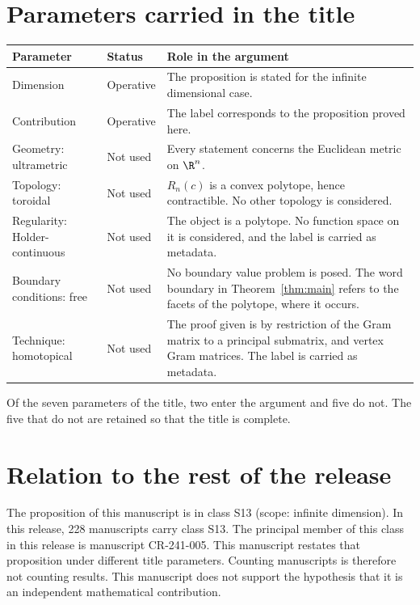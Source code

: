 \documentclass[11pt]{article}
\begin{document}
\section{Parameters carried in the title}\label{sec:params}
\begin{center}
\small
\begin{tabular}{p{}p{}p{}}
\toprule
Parameter & Status & Role in the argument \\
\midrule
Dimension & Operative & The proposition is stated for the infinite dimensional case. \\
Contribution & Operative & The label corresponds to the proposition proved here. \\
Geometry: ultrametric & Not used & Every statement concerns the Euclidean metric on $\R^n$. \\
Topology: toroidal & Not used & $R_n(c)$ is a convex polytope, hence contractible. No other topology is considered. \\
Regularity: Holder-continuous & Not used & The object is a polytope. No function space on it is considered, and the label is carried as metadata. \\
Boundary conditions: free & Not used & No boundary value problem is posed. The word boundary in Theorem~\ref{thm:main} refers to the facets of the polytope, where it occurs. \\
Technique: homotopical & Not used & The proof given is by restriction of the Gram matrix to a principal submatrix, and vertex Gram matrices. The label is carried as metadata. \\
\bottomrule
\end{tabular}
\end{center}
Of the seven parameters of the title, two enter the argument and five do not. The five that do not are retained so that the title is complete.

\section{Relation to the rest of the release}
The proposition of this manuscript is in class S13 (scope: infinite dimension).
In this release, 228 manuscripts carry class S13. The principal member of this class in this release is manuscript CR-241-005. This manuscript restates that proposition under different title parameters.
Counting manuscripts is therefore not counting results. This manuscript does not support the hypothesis that it is an independent mathematical contribution.
\end{document}
